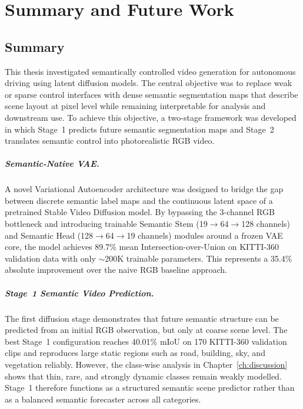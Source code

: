 \chapter{Summary and Future Work}
\label{ch:summary}

\section{Summary}
\label{sec:summary}

This thesis investigated semantically controlled video generation for autonomous driving using latent diffusion models. The central objective was to replace weak or sparse control interfaces with dense semantic segmentation maps that describe scene layout at pixel level while remaining interpretable for analysis and downstream use. To achieve this objective, a two-stage framework was developed in which Stage~1 predicts future semantic segmentation maps and Stage~2 translates semantic control into photorealistic RGB video.

\paragraph{Semantic-Native VAE.}
A novel Variational Autoencoder architecture was designed to bridge the gap between discrete semantic label maps and the continuous latent space of a pretrained Stable Video Diffusion model. By bypassing the 3-channel RGB bottleneck and introducing trainable Semantic Stem (19$\rightarrow$64$\rightarrow$128 channels) and Semantic Head (128$\rightarrow$64$\rightarrow$19 channels) modules around a frozen VAE core, the model achieves 89.7\% mean Intersection-over-Union on KITTI-360 validation data with only $\sim$200K trainable parameters. This represents a 35.4\% absolute improvement over the naive RGB baseline approach.

\paragraph{Stage~1 Semantic Video Prediction.}
The first diffusion stage demonstrates that future semantic structure can be predicted from an initial RGB observation, but only at coarse scene level. The best Stage~1 configuration reaches 40.01\% mIoU on 170 KITTI-360 validation clips and reproduces large static regions such as road, building, sky, and vegetation reliably. However, the class-wise analysis in Chapter~\ref{ch:discussion} shows that thin, rare, and strongly dynamic classes remain weakly modelled. Stage~1 therefore functions as a structured semantic scene predictor rather than as a balanced semantic forecaster across all categories.


